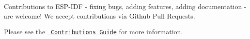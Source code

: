 Contributions to ESP-\/\+IDF -\/ fixing bugs, adding features, adding documentation -\/ are welcome! We accept contributions via Github Pull Requests.

Please see the \href{https://docs.espressif.com/projects/esp-idf/en/latest/esp32/contribute/index.html}{\texttt{ Contributions Guide}} for more information. 
